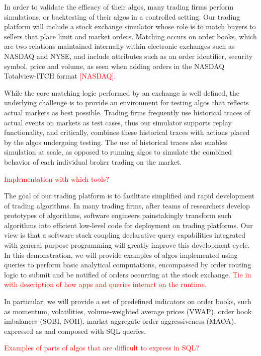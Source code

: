 \documentclass{vldb}
\newcommand{\tinysection}[1]{\noindent{\bf #1.}}
\newcommand{\todo}[1]{\textcolor{red}{#1}}
\begin{document}
\tinysection{Stock exchange simulator} In order to validate the efficacy of
their algos, many trading firms perform simulations, or backtesting of their
algos in a controlled setting. Our trading platform will include a stock
exchange simulator whose role is to match buyers to sellers that place limit
and market orders. Matching occurs on order books, which are two relations
maintained internally within electronic exchanges such as NASDAQ and NYSE, and
include attributes such as an order identifier, security symbol, price and
volume, as seen when adding orders in the NASDAQ Totalview-ITCH format
\todo{[NASDAQ]}.

While the core matching logic performed by an exchange is well defined, the
underlying challenge is to provide an environment for testing algos that
reflects actual markets as best possible. Trading firms frequently use
historical traces of actual events on markets as test cases, thus our simulator
supports replay functionality, and critically, combines these historical traces
with actions placed by the algos undergoing testing. The use of historical
traces also enables simulation at scale, as opposed to running algos to simulate
the combined behavior of each individual broker trading on the market.

\todo{Implementation with which tools?}

\tinysection{Trading algorithms}
The goal of our trading platform is to facilitate simplified and rapid
development of trading algorithms. In many trading firms, after teams of
researchers develop prototypes of algorithms, software engineers painstakingly
transform such algorithms into efficient low-level code for deployment on
trading platforms. Our view is that a software stack coupling declarative query
capabilities integrated with general purpose programming will greatly improve
this development cycle. In this demonstration, we will provide examples of algos
implemented using queries to perform basic analytical computations, encompassed
by order routing logic to submit and be notified of orders occurring at the
stock exchange. \todo{Tie in with description of how apps and queries interact
on the runtime.}

In particular, we will provide a set of predefined indicators on
order books, such as momentum, volatilities, volume-weighted average prices
(VWAP), order book imbalances (SOBI, NOII), market aggregate order
aggressiveness (MAOA), expressed as and composed with SQL queries.

\todo{Examples of parts of algos that are difficult to express in SQL?}
\end{document}
